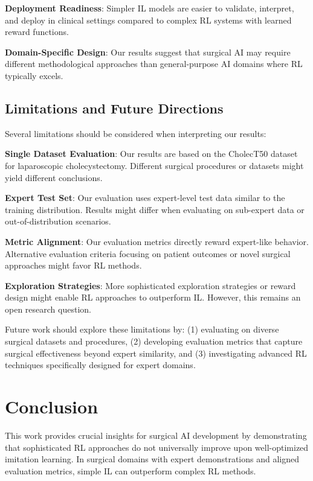 \documentclass[runningheads]{llncs}
\begin{document}
\textbf{Deployment Readiness}: Simpler IL models are easier to validate, interpret, and deploy in clinical settings compared to complex RL systems with learned reward functions.

\textbf{Domain-Specific Design}: Our results suggest that surgical AI may require different methodological approaches than general-purpose AI domains where RL typically excels.

\subsection{Limitations and Future Directions}

Several limitations should be considered when interpreting our results:

\textbf{Single Dataset Evaluation}: Our results are based on the CholecT50 dataset for laparoscopic cholecystectomy. Different surgical procedures or datasets might yield different conclusions.

\textbf{Expert Test Set}: Our evaluation uses expert-level test data similar to the training distribution. Results might differ when evaluating on sub-expert data or out-of-distribution scenarios.

\textbf{Metric Alignment}: Our evaluation metrics directly reward expert-like behavior. Alternative evaluation criteria focusing on patient outcomes or novel surgical approaches might favor RL methods.

\textbf{Exploration Strategies}: More sophisticated exploration strategies or reward design might enable RL approaches to outperform IL. However, this remains an open research question.

Future work should explore these limitations by: (1) evaluating on diverse surgical datasets and procedures, (2) developing evaluation metrics that capture surgical effectiveness beyond expert similarity, and (3) investigating advanced RL techniques specifically designed for expert domains.


\section{Conclusion}

This work provides crucial insights for surgical AI development by demonstrating that sophisticated RL approaches do not universally improve upon well-optimized imitation learning. In surgical domains with expert demonstrations and aligned evaluation metrics, simple IL can outperform complex RL methods.
\end{document}
